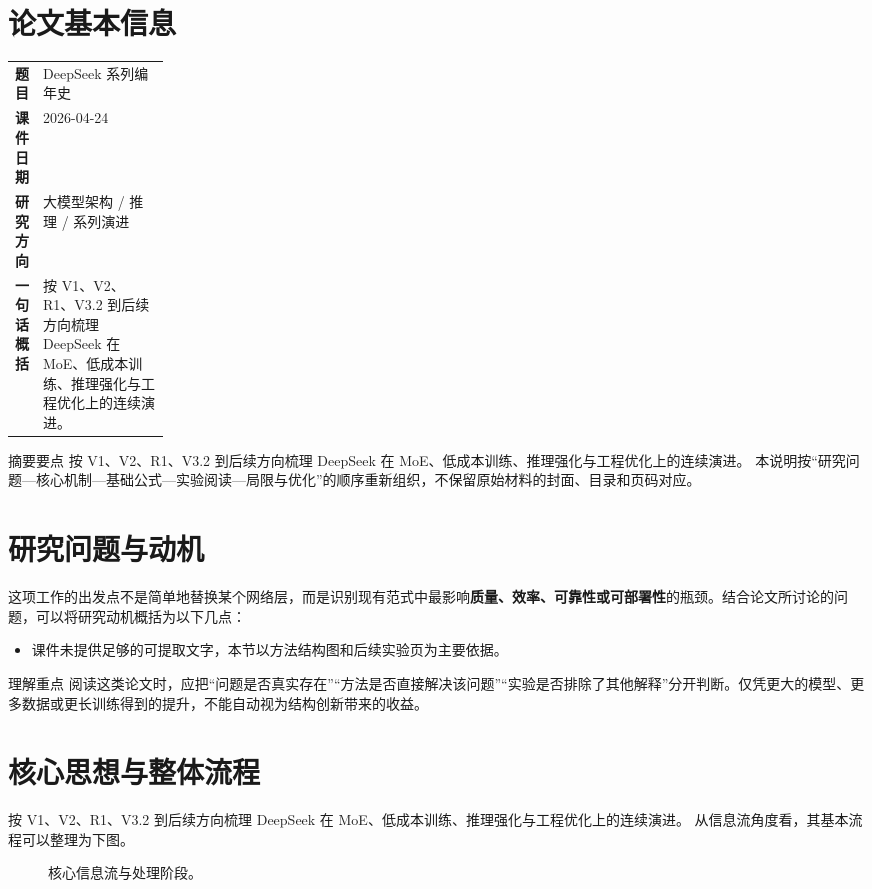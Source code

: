 \documentclass[UTF8,11pt,a4paper]{ctexart}
\newcommand{\term}[1]{\textbf{\textcolor{mainblue}{#1}}}
\begin{document}
\section{论文基本信息}
\begin{center}
\begin{tabularx}{0.94\linewidth}{>{\bfseries}p{0.18\linewidth}X}
\toprule
题目 & DeepSeek 系列编年史\\
课件日期 & 2026-04-24\\
研究方向 & 大模型架构 / 推理 / 系列演进\\
一句话概括 & 按 V1、V2、R1、V3.2 到后续方向梳理 DeepSeek 在 MoE、低成本训练、推理强化与工程优化上的连续演进。\\
\bottomrule
\end{tabularx}
\end{center}

\begin{infobox}{摘要要点}
按 V1、V2、R1、V3.2 到后续方向梳理 DeepSeek 在 MoE、低成本训练、推理强化与工程优化上的连续演进。 本说明按“研究问题—核心机制—基础公式—实验阅读—局限与优化”的顺序重新组织，不保留原始材料的封面、目录和页码对应。
\end{infobox}

\section{研究问题与动机}
这项工作的出发点不是简单地替换某个网络层，而是识别现有范式中最影响\term{质量、效率、可靠性或可部署性}的瓶颈。结合论文所讨论的问题，可以将研究动机概括为以下几点：
\begin{itemize}
\item 课件未提供足够的可提取文字，本节以方法结构图和后续实验页为主要依据。
\end{itemize}

\begin{notebox}{理解重点}
阅读这类论文时，应把“问题是否真实存在”“方法是否直接解决该问题”“实验是否排除了其他解释”分开判断。仅凭更大的模型、更多数据或更长训练得到的提升，不能自动视为结构创新带来的收益。
\end{notebox}

\section{核心思想与整体流程}
按 V1、V2、R1、V3.2 到后续方向梳理 DeepSeek 在 MoE、低成本训练、推理强化与工程优化上的连续演进。 从信息流角度看，其基本流程可以整理为下图。

\begin{figure}[H]
\centering
{}
\caption{核心信息流与处理阶段。}
\end{figure}
\end{document}
